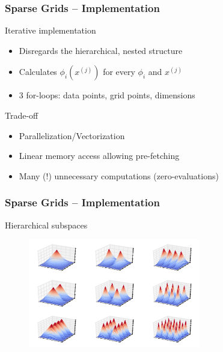 \begin{frame}
  \frametitle{Sparse Grids -- Implementation}
  \topline
  \vspace{-10px}
  \begin{block}{Iterative implementation}
    \begin{itemize}
    \item Disregards the hierarchical, nested structure
    \item Calculates $\phi_i(x^{(j)})$ for every $\phi_i$ and $x^{(j)}$
    \item 3 for-loops: data points, grid points, dimensions
    \end{itemize}
  \end{block}
  \begin{block}{Trade-off}
    \begin{itemize}
    \item Parallelization/Vectorization
    \item Linear memory access allowing pre-fetching
    \item Many (!) unnecessary computations (zero-evaluations)
    \end{itemize}
  \end{block}
\end{frame}


\begin{frame}
  \frametitle{Sparse Grids -- Implementation}
  \topline
  \vspace{-10px}
  \begin{block}{Hierarchical subspaces}
    \begin{figure}[!htp]
      \centering
      \includegraphics[width=7.5cm]{images/sparsegrid_2dhats}
      \vspace{-12px}
      \caption{}
    \end{figure}
  \end{block}
\end{frame}


